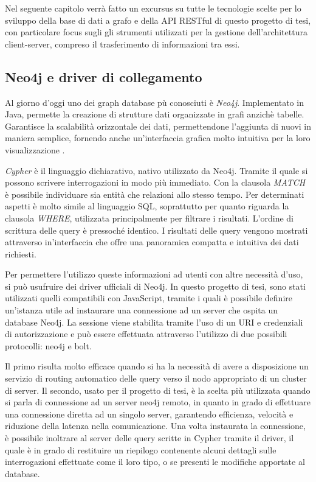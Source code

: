 
Nel seguente capitolo  verrà fatto un excursus su tutte le tecnologie scelte per lo sviluppo della base di dati a grafo e della API RESTful di questo progetto di tesi, con particolare focus sugli gli strumenti utilizzati per la gestione dell'architettura client-server, compreso il trasferimento di informazioni tra essi.

\subsection{Neo4j e driver di collegamento}

Al giorno d'oggi uno dei graph database pù conosciuti  è \emph{Neo4j}. Implementato in Java, permette la creazione di strutture dati organizzate in grafi anzichè tabelle.
Garantisce la scalabilità orizzontale dei dati, permettendone l'aggiunta di nuovi in maniera semplice, fornendo anche un'interfaccia grafica molto intuitiva per la loro visualizzazione  \cite{Graph-neo4j-analysis}.

\emph{Cypher} \cite{neo4j} è il linguaggio dichiarativo, nativo utilizzato da Neo4j.
Tramite il quale si possono scrivere interrogazioni in modo più immediato.
Con la clausola \emph{MATCH} è possibile individuare sia entità che relazioni allo stesso tempo.
Per determinati aspetti è molto simile al linguaggio SQL, soprattutto per quanto riguarda la clausola \emph{WHERE}, utilizzata principalmente per filtrare i risultati. L'ordine di scrittura delle query è pressoché identico.
I risultati delle query  vengono mostrati attraverso in'interfaccia che offre una panoramica compatta e intuitiva dei dati richiesti.

Per permettere l'utilizzo queste informazioni ad utenti con altre necessità d'uso, si può usufruire dei driver ufficiali di Neo4j.
In questo progetto di tesi, sono stati utilizzati quelli compatibili con JavaScript, tramite i quali è possibile definire un'istanza utile ad instaurare una connessione ad un server che ospita un database Neo4j.
La sessione viene stabilita tramite l'uso di un URI e credenziali di autorizzazione e può essere effettuata attraverso l'utilizzo di due possibili protocolli: neo4j e bolt.

Il primo risulta molto efficace quando si ha la necessità di avere a disposizione un servizio di routing automatico delle query verso il nodo appropriato di un cluster di server.
Il secondo, usato per il progetto di tesi, è la scelta più utilizzata quando si parla di connessione ad un server neo4j remoto, in quanto in grado di effettuare una connessione diretta ad un singolo server, garantendo efficienza, velocità e riduzione della latenza nella comunicazione.
Una volta instaurata la connessione, è possibile inoltrare al server delle query scritte in Cypher tramite il driver, il quale è in grado di restituire un riepilogo contenente alcuni dettagli sulle interrogazioni effettuate come il loro tipo, o se presenti le modifiche apportate al database.



